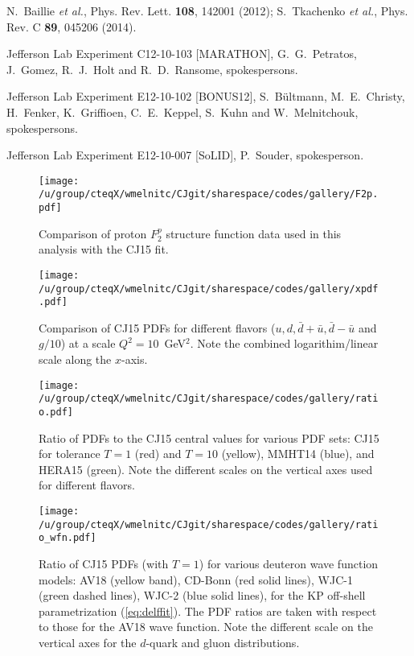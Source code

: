 \documentclass[aps,prd,amsmath,preprint]{revtex4}
\begin{document}
\begin{thebibliography}{99}
N.~Baillie {\it et al.},
Phys. Rev. Lett. {\bf 108}, 142001 (2012);
%
S.~Tkachenko {\it et al.},
Phys. Rev. C {\bf 89}, 045206 (2014).

Jefferson Lab Experiment C12-10-103 [MARATHON],
G.~G.~Petratos, J.~Gomez, R.~J.~Holt and R.~D.~Ransome,
spokespersons.
 
Jefferson Lab Experiment E12-10-102 [BONUS12],
S.~B\"ultmann, M.~E.~Christy, H.~Fenker, K.~Griffioen, C.~E.~Keppel,
S.~Kuhn and W.~Melnitchouk,
spokespersons.
 
Jefferson Lab Experiment E12-10-007 [SoLID],
P.~Souder, spokesperson.

\end{thebibliography}


\newpage
\begin{figure}[t]
\texttt{[image: /u/group/cteqX/wmelnitc/CJgit/sharespace/codes/gallery/F2p.pdf]}
\caption{Comparison of proton $F_2^p$ structure function data
	used in this analysis with the CJ15 fit.}
\label{fig:F2p}
\end{figure} 


\begin{figure}[t]
\texttt{[image: /u/group/cteqX/wmelnitc/CJgit/sharespace/codes/gallery/xpdf.pdf]}
\caption{Comparison of CJ15 PDFs for different flavors
	($u, d, \bar d + \bar u, \bar d - \bar u$ and $g/10$)
	at a scale $Q^2=10$~GeV$^2$.
	Note the combined logarithim/linear scale along the $x$-axis.}
\label{fig:pdf}
\end{figure} 


\begin{figure}[t]
\texttt{[image: /u/group/cteqX/wmelnitc/CJgit/sharespace/codes/gallery/ratio.pdf]}
\caption{Ratio of PDFs to the CJ15 central values for various PDF sets:
	CJ15 for tolerance $T=1$ (red) and $T=10$ (yellow),
	MMHT14 \cite{MMHT14} (blue), and
	HERA15 \cite{HERA15} (green).
	Note the different scales on the vertical axes used for
	different flavors.}
\label{fig:ratio_other}
\end{figure} 


\begin{figure}[t]
\texttt{[image: /u/group/cteqX/wmelnitc/CJgit/sharespace/codes/gallery/ratio\_wfn.pdf]}
\caption{Ratio of CJ15 PDFs (with $T=1$) for various deuteron
	wave function models:
	AV18 (yellow band),
	CD-Bonn (red solid lines),
	WJC-1 (green dashed lines),
	WJC-2 (blue solid lines),
	for the KP off-shell parametrization (\ref{eq:delffit}).
	The PDF ratios are taken with respect to those for the
	AV18 wave function.
	Note the different scale on the vertical axes for the
	$d$-quark and gluon distributions.}
\label{fig:ratio_wfn}
\end{figure} 
\end{document}
